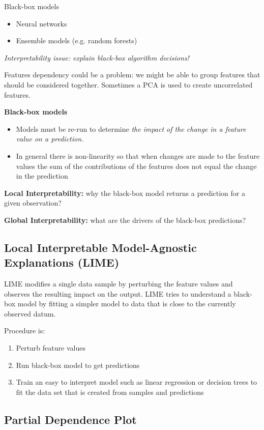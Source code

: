 Black-box models
\begin{itemize}
    \item Neural networks
    \item Ensemble models (e.g. random forests)
\end{itemize}

\textit{Interpretability issue: explain black-box algorithm decisions!}

Features dependency could be a problem: we might be able to group features that should be considered together. Sometimes a PCA is used to create uncorrelated features. 

\textbf{Black-box models}
\begin{itemize}
    \item Models must be re-run to determine \textit{the impact of the change in a feature value on a prediction.}
    \item In general there is non-linearity so that when changes are made to the feature values the sum of the contributions of the features does not equal the change in the prediction
\end{itemize}

\textbf{Local Interpretability:} why the black-box model returns a prediction for a given observation?

\textbf{Global Interpretability:} what are the drivers of the black-box predictions?

\subsection{Local Interpretable Model-Agnostic Explanations (LIME)}

LIME modifies a single data sample by perturbing the feature values and observes the resulting impact on the output. LIME tries to understand a black-box model by fitting a simpler model to data that is close to the currently observed datum.

Procedure is:
\begin{enumerate}
    \item Perturb feature values
    \item Run black-box model to get predictions
    \item Train an easy to interpret model such as linear regression or decision trees to fit the data set that is created from samples and predictions
\end{enumerate}

\subsection{Partial Dependence Plot}

